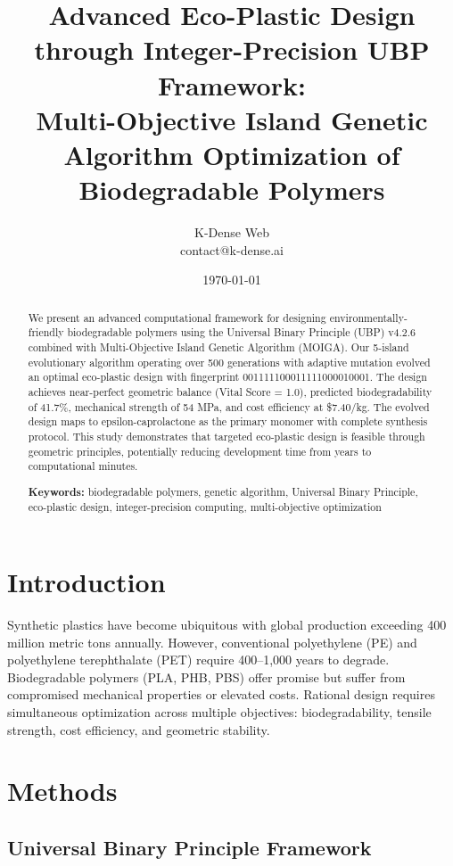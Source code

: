 \documentclass[11pt]{article}
\title{Advanced Eco-Plastic Design through Integer-Precision UBP Framework:\\
Multi-Objective Island Genetic Algorithm Optimization of Biodegradable Polymers}
\author{K-Dense Web \\ contact@k-dense.ai}
\date{\today}
\begin{document}
\maketitle

\begin{abstract}
We present an advanced computational framework for designing environmentally-friendly biodegradable polymers using the Universal Binary Principle (UBP) v4.2.6 combined with Multi-Objective Island Genetic Algorithm (MOIGA). Our 5-island evolutionary algorithm operating over 500 generations with adaptive mutation evolved an optimal eco-plastic design with fingerprint 001111100011111000010001. The design achieves near-perfect geometric balance (Vital Score = 1.0), predicted biodegradability of 41.7\%, mechanical strength of 54 MPa, and cost efficiency at \$7.40/kg. The evolved design maps to epsilon-caprolactone as the primary monomer with complete synthesis protocol. This study demonstrates that targeted eco-plastic design is feasible through geometric principles, potentially reducing development time from years to computational minutes.

\textbf{Keywords:} biodegradable polymers, genetic algorithm, Universal Binary Principle, eco-plastic design, integer-precision computing, multi-objective optimization
\end{abstract}

\section{Introduction}

Synthetic plastics have become ubiquitous with global production exceeding 400 million metric tons annually. However, conventional polyethylene (PE) and polyethylene terephthalate (PET) require 400--1,000 years to degrade. Biodegradable polymers (PLA, PHB, PBS) offer promise but suffer from compromised mechanical properties or elevated costs. Rational design requires simultaneous optimization across multiple objectives: biodegradability, tensile strength, cost efficiency, and geometric stability.

\section{Methods}

\subsection{Universal Binary Principle Framework}
\end{document}
